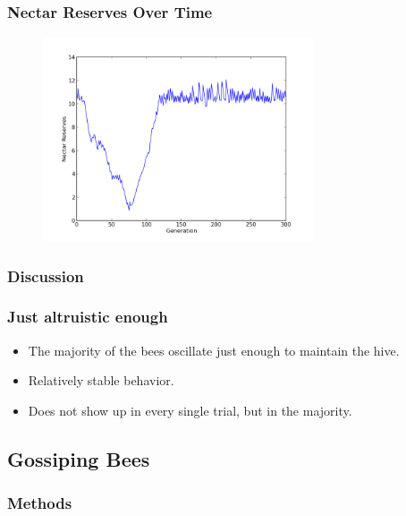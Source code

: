 \documentclass{beamer}
\begin{document}
        \begin{frame}[t]\frametitle{Nectar Reserves Over Time}
          \begin{figure}
          \includegraphics[width=8cm]{recurrent_bees_nectar.png}
          \end{figure}
        \end{frame}

      \subsubsection{Discussion} %
      \label{ssub:discussion}
        \begin{frame}[c]\frametitle{Just altruistic enough}
            
          \begin{itemize}
            \item The majority of the bees oscillate just enough to maintain 
                  the hive.
            \item Relatively stable behavior.
            \item Does not show up in every single trial, but in the majority.
          \end{itemize}
        
        \end{frame}


    \subsection{Gossiping Bees} %
    \label{sub:gossipping_bees}
    
      \subsubsection{Methods} %
      \label{ssub:methods}
\end{document}
